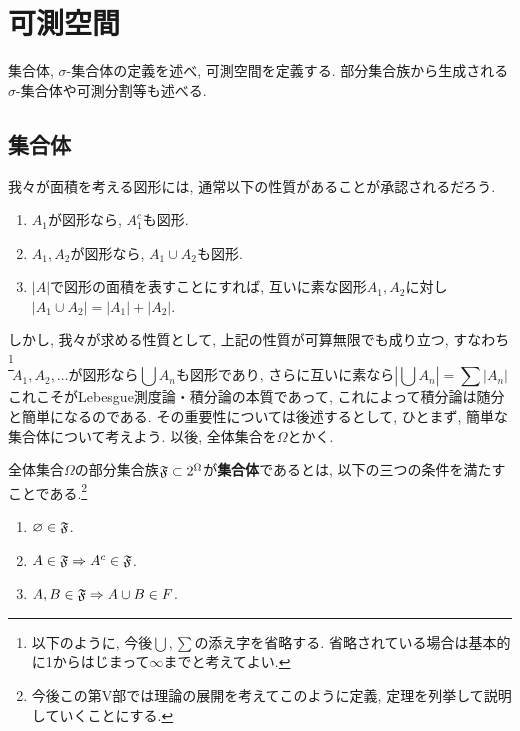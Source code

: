 \renewcommand{\labelenumi}{(\arabic{enumi})}
\section{可測空間}
    集合体, $\sigma$-集合体の定義を述べ, 可測空間を定義する. 部分集合族から生成される$\sigma$-集合体や可測分割等も述べる.

    \subsection{集合体}
        我々が面積を考える図形には, 通常以下の性質があることが承認されるだろう.
        \begin{enumerate}
            \item $A_1$が図形なら, $A_1^c$も図形.
            \item $A_1,A_2$が図形なら, $A_1\cup A_2$も図形.
            \item $|A|$で図形の面積を表すことにすれば, 互いに素な図形$A_1,A_2$に対し$|A_1\cup A_2|=|A_1| + |A_2|$.
        \end{enumerate}

        しかし, 我々が求める性質として, 上記の性質が可算無限でも成り立つ, すなわち\footnote{以下のように, 今後$\bigcup,\sum$の添え字を省略する. 省略されている場合は基本的に1からはじまって$\infty$までと考えてよい.}
        \begin{equation*}
            A_1,A_2,\dots \text{が図形なら} \bigcup A_n \text{も図形であり, さらに互いに素なら} \left|\bigcup A_n\right|=\sum |A_n| 
        \end{equation*}
        これこそがLebesgue測度論・積分論の本質であって, これによって積分論は随分と簡単になるのである. その重要性については後述するとして, 
        ひとまず, 簡単な集合体について考えよう. 以後, 全体集合を$\Omega$とかく.
        
        \begin{definition}
            全体集合$\Omega$の部分集合族$\mathfrak{F}\subset 2^\Omega$が\textbf{集合体}であるとは, 以下の三つの条件を満たすことである.\footnote{今後この第V部では理論の展開を考えてこのように定義, 定理を列挙して説明していくことにする.}
            \begin{enumerate}
                \item $\varnothing \in \mathfrak{F}$.
                \item $A \in \mathfrak{F} \Rightarrow A^c \in \mathfrak{F}$.
                \item $A,B \in \mathfrak{F} \Rightarrow A\cup B \in F$.
            \end{enumerate}
        \end{definition}

